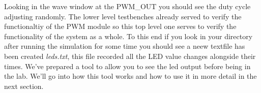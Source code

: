 Looking in the wave window at the PWM\_OUT you should see the duty cycle adjusting randomly. The lower level testbenches already served to verify the functionaltiy of the PWM module so this top level one serves to verify the functionality of the system as a whole. To this end if you look in your directory after running the simulation for some time you should see a neew textfile has been created \textit{leds.txt}, this file recorded all the LED value changes alongside their times. We've prepared a tool to allow you to see the led output before being in the lab. We'll go into how this tool works and how to use it in more detail in the next section.    